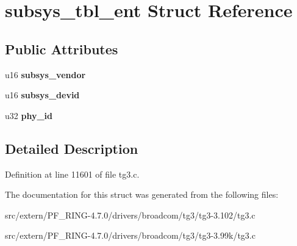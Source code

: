 \hypertarget{structsubsys__tbl__ent}{
\section{subsys\_\-tbl\_\-ent Struct Reference}
\label{structsubsys__tbl__ent}
}
\subsection*{Public Attributes}
\begin{DoxyCompactItemize}
\item 
\hypertarget{structsubsys__tbl__ent_a4eb330cf2f9d3f63829a8134ae670f9d}{
u16 {\bfseries subsys\_\-vendor}}
\label{structsubsys__tbl__ent_a4eb330cf2f9d3f63829a8134ae670f9d}

\item 
\hypertarget{structsubsys__tbl__ent_a1234bf97d6f3bfc27f37bd183b53a383}{
u16 {\bfseries subsys\_\-devid}}
\label{structsubsys__tbl__ent_a1234bf97d6f3bfc27f37bd183b53a383}

\item 
\hypertarget{structsubsys__tbl__ent_a9d0a97e7fad94917ef71408b6eeb6d40}{
u32 {\bfseries phy\_\-id}}
\label{structsubsys__tbl__ent_a9d0a97e7fad94917ef71408b6eeb6d40}

\end{DoxyCompactItemize}


\subsection{Detailed Description}


Definition at line 11601 of file tg3.c.



The documentation for this struct was generated from the following files:\begin{DoxyCompactItemize}
\item 
src/extern/PF\_\-RING-\/4.7.0/drivers/broadcom/tg3/tg3-\/3.102/tg3.c\item 
src/extern/PF\_\-RING-\/4.7.0/drivers/broadcom/tg3/tg3-\/3.99k/tg3.c\end{DoxyCompactItemize}
